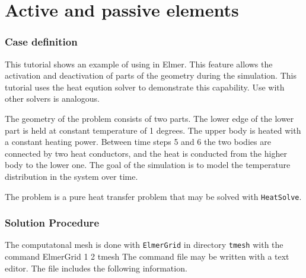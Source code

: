 \chapter{Active and passive elements}


\subsection*{Case definition}

This tutorial shows an example of using  in
Elmer. This feature allows the activation and deactivation of
parts of the geometry during the simulation. This tutorial uses the
heat eqution solver to demonstrate this capability. Use with other
solvers is analogous.

The geometry of the problem consists of two parts. The lower edge of
the lower part is held at constant temperature of 1 degrees. The upper
body is heated with a constant heating power. Between time steps 5 and
6 the two bodies are connected by two heat conductors, and the heat is
conducted from the higher body to the lower one. The goal of the
simulation is to model the temperature distribution in the system over
time. 

The problem is a pure heat transfer problem that may be solved
with \texttt{HeatSolve}. 


\subsection*{Solution Procedure}

The computatonal mesh is done with \texttt{ElmerGrid} in directory \texttt{tmesh} 
with the command 
%
\ttbegin
ElmerGrid 1 2 tmesh
\ttend
%
The command file may be written with a text editor. The file includes
the following information. 

